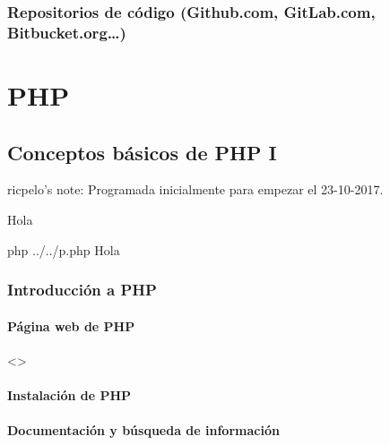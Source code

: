 \documentclass[a4paper,12pt,spanish]{sphinxmanual}
\begin{document}
\section{Repositorios de código (Github.com, GitLab.com, Bitbucket.org…)}
\label{\detokenize{introduccion:repositorios-de-codigo-github-com-gitlab-com-bitbucket-org}}

\part{PHP}
\label{\detokenize{php:php}}\label{\detokenize{php::doc}}

\chapter{Conceptos básicos de PHP I}
\label{\detokenize{php:conceptos-basicos-de-php-i}}
ricpelo’s note: Programada inicialmente para empezar el 23-10-2017. \sphinxcode{\_\_\_\_\_\_}

\begin{sphinxVerbatim}[commandchars=\\\{\}]
Hola
\end{sphinxVerbatim}

\begin{sphinxVerbatim}[commandchars=\\\{\}]
\PYGZdl{} php ../../p.php
Hola
\end{sphinxVerbatim}


\section{Introducción a PHP}
\label{\detokenize{php:introduccion-a-php}}

\subsection{Página web de PHP}
\label{\detokenize{php:pagina-web-de-php}}
\textless{}\textgreater{}


\subsection{Instalación de PHP}
\label{\detokenize{php:instalacion-de-php}}

\subsection{Documentación y búsqueda de información}
\label{\detokenize{php:documentacion-y-busqueda-de-informacion}}
\end{document}
